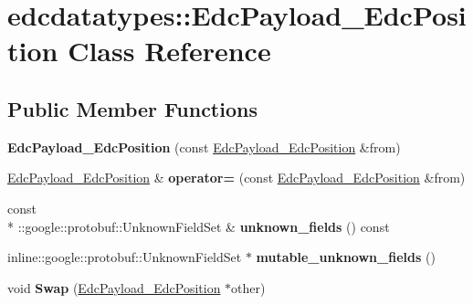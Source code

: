\hypertarget{classedcdatatypes_1_1_edc_payload___edc_position}{\section{edcdatatypes\-:\-:Edc\-Payload\-\_\-\-Edc\-Position Class Reference}
\label{classedcdatatypes_1_1_edc_payload___edc_position}
}
\subsection*{Public Member Functions}
\begin{DoxyCompactItemize}
\item 
\hypertarget{classedcdatatypes_1_1_edc_payload___edc_position_a8d41eb62a91629cabaa13a9f1f568705}{{\bfseries Edc\-Payload\-\_\-\-Edc\-Position} (const \hyperlink{classedcdatatypes_1_1_edc_payload___edc_position}{Edc\-Payload\-\_\-\-Edc\-Position} \&from)}\label{classedcdatatypes_1_1_edc_payload___edc_position_a8d41eb62a91629cabaa13a9f1f568705}

\item 
\hypertarget{classedcdatatypes_1_1_edc_payload___edc_position_a3e90dfa8d31c43330dbb87cc12956d0e}{\hyperlink{classedcdatatypes_1_1_edc_payload___edc_position}{Edc\-Payload\-\_\-\-Edc\-Position} \& {\bfseries operator=} (const \hyperlink{classedcdatatypes_1_1_edc_payload___edc_position}{Edc\-Payload\-\_\-\-Edc\-Position} \&from)}\label{classedcdatatypes_1_1_edc_payload___edc_position_a3e90dfa8d31c43330dbb87cc12956d0e}

\item 
\hypertarget{classedcdatatypes_1_1_edc_payload___edc_position_ab9f9d93f51bc31fcba05a0f2d0e694e7}{const \\*
\-::google\-::protobuf\-::\-Unknown\-Field\-Set \& {\bfseries unknown\-\_\-fields} () const }\label{classedcdatatypes_1_1_edc_payload___edc_position_ab9f9d93f51bc31fcba05a0f2d0e694e7}

\item 
\hypertarget{classedcdatatypes_1_1_edc_payload___edc_position_a19b735b6be6f5dde4760af3ad14c4de9}{inline\-::google\-::protobuf\-::\-Unknown\-Field\-Set $\ast$ {\bfseries mutable\-\_\-unknown\-\_\-fields} ()}\label{classedcdatatypes_1_1_edc_payload___edc_position_a19b735b6be6f5dde4760af3ad14c4de9}

\item 
\hypertarget{classedcdatatypes_1_1_edc_payload___edc_position_a24bdb3205b979d14b2781f68ce4af00a}{void {\bfseries Swap} (\hyperlink{classedcdatatypes_1_1_edc_payload___edc_position}{Edc\-Payload\-\_\-\-Edc\-Position} $\ast$other)}\label{classedcdatatypes_1_1_edc_payload___edc_position_a24bdb3205b979d14b2781f68ce4af00a}


\end{DoxyCompactItemize}
